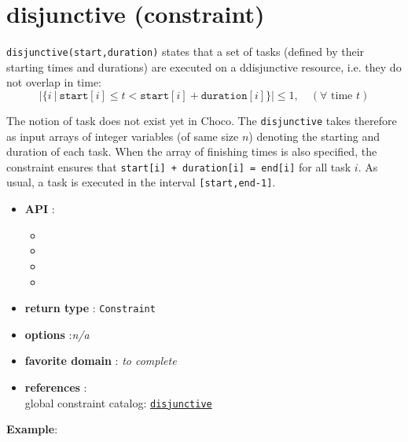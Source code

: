\label{disjunctive}
\hypertarget{disjunctive}{}

\section{disjunctive (constraint)}\label{disjunctive:disjunctiveconstraint}\hypertarget{disjunctive:disjunctiveconstraint}{}

\begin{notedef}
  \texttt{disjunctive(start,duration)} states that a set of tasks (defined by their starting times and durations) are executed on a ddisjunctive resource, i.e. they do not overlap in time:
$$|\{i\ |\ \mathtt{start}[i]\le t < \mathtt{start}[i]+\mathtt{duration}[i]\}| \le 1,\quad (\forall \text{ time } t)$$
\end{notedef}

The notion of task does not exist yet in Choco. The \texttt{disjunctive} takes therefore as input arrays of integer variables (of same size $n$) denoting the starting and duration of each task. When the array of finishing times is also specified, the constraint ensures that \texttt{start[i] + duration[i] = end[i]} for all task $i$.
As usual, a task is executed in the interval \texttt{[start,end-1]}.

\begin{itemize}
	\item \textbf{API} :
	\begin{itemize}
		\item {}
		\item {}
		\item {}
		\item {}
	\end{itemize}
	\item \textbf{return type} : \texttt{Constraint}
	\item \textbf{options} :\emph{n/a}
	\item \textbf{favorite domain} : \emph{to complete}
	\item \textbf{references} :\\
      global constraint catalog: \href{http://www.emn.fr/x-info/sdemasse/gccat/Cdisjunctive.html}{\tt disjunctive}
\end{itemize}

\textbf{Example}:
%
